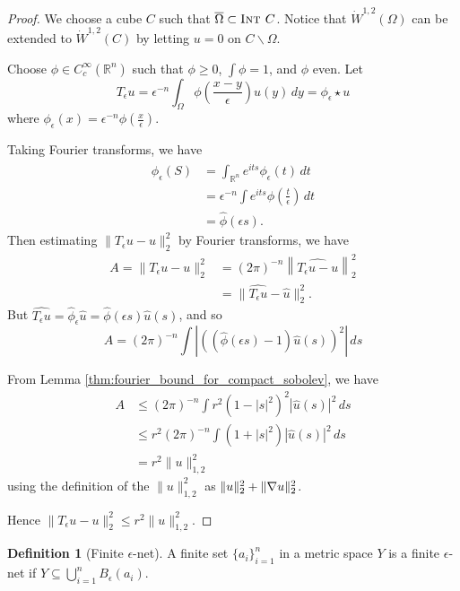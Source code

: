 \documentclass[10pt, oneside, reqno]{amsart}
\theoremstyle{plain}%
\numberwithin{equation}{section}
\theoremstyle{definition}
\newtheorem{defn}[thm]{Definition}
\theoremstyle{remark}
\newcommand{\R}{\mathbb{R}}
\begin{document}
\begin{proof} 
	We choose a cube $C$ such that $\overline \Omega \subset \textsc{Int\ } C$.  Notice that $\dot W^{1, 2}(\Omega)$ can be extended to $\dot W^{1, 2}(C)$ by letting $u = 0$ on $C \backslash \Omega$.  
	
	Choose $\phi \in C^\infty_c(\R^n)$ such that $\phi \geq 0$, $\int \phi = 1$, and $\phi$ even.  Let \[
		T_\epsilon u = \epsilon^{-n} \int_\Omega \phi\left(\frac{x-y}{\epsilon} \right) u(y) \, dy = \phi_\epsilon \star u
	\] where $\phi_\epsilon(x) = \epsilon^{-n} \phi \left( \frac{x}{\epsilon} \right)$.
	
	Taking Fourier transforms, we have
	\begin{align*}
		\hat \phi_\epsilon(S) &= \int_{\R^n} e^{its} \phi_\epsilon(t) \, dt \\
			&= \epsilon^{-n} \int e^{its} \phi \left( \frac{t}{\epsilon} \right) \, dt \\
			&= \hat \phi(\epsilon s).
	\end{align*}  Then estimating $\| T_\epsilon u - u \|_2^2$ by Fourier transforms, we have \begin{align*}
		A = \| T_\epsilon u - u \|_2^2 &= (2 \pi)^{-n} \left\| \hat{T_\epsilon u - u}\right\|_2^2 \\
		&= \| \hat{T_\epsilon u } - \hat u \|_2^2.  
	\end{align*}  But $\hat{T_\epsilon u} = \hat \phi_\epsilon \hat u = \hat \phi (\epsilon s) \hat u(s)$, and so \[
		A = (2 \pi)^{-n} \int \left| \left( \left( \hat \phi(\epsilon s) - 1 \right) \hat u(s) \right)^2 \right| \, ds
	\]
	
	
	
	 From Lemma \ref{thm:fourier_bound_for_compact_sobolev}, we have \begin{align*}
		A &\leq (2 \pi)^{-n} \int r^2 \left(1 - |s|^2 \right)^2 \left| \hat u (s) \right|^2 \, ds \\
		&\leq r^2 (2 \pi)^{-n} \int \left( 1 + |s|^2 \right) \left| \hat u(s)\right|^2 \, ds \\
		&= r^2 \| u \|_{1, 2}^2
	\end{align*} using the definition of the $\|u \|_{1, 2}^2$  as $\| u \|_2^2 + \| \nabla u \|_2^2$.  
	
	Hence $\|T_\epsilon u - u \|_2^2 \leq r^2 \| u \|_{1, 2}^2$.
\end{proof}

\begin{defn}[Finite $\epsilon$-net]
A finite set $\{ a_i \}_{i=1}^n$ in a metric space $Y$ is a finite $\epsilon$-net if $Y \subseteq \bigcup_{i=1}^n B_\epsilon(a_i)$.
\end{defn}
\end{document}
